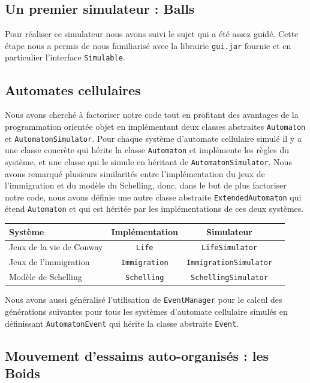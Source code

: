 \documentclass [a4paper,11pt,titlepage] {article}
\begin{document}
\subsection{Un premier simulateur : Balls}
Pour réaliser ce simulateur nous avons suivi le sujet qui a été assez guidé. Cette étape nous a permis de nous familiarisé avec la librairie \texttt{gui.jar} fournie et en particulier l'interface \texttt{Simulable}.
\subsection{Automates cellulaires}
Nous avons cherché à factoriser notre code tout en profitant des avantages de la programmation orientée objet en implémentant deux classes abstraites \texttt{Automaton} et \texttt{AutomatonSimulator}. Pour chaque système d'automate cellulaire simulé il y a une classe concrète qui hérite la classe \texttt{Automaton} et implémente les règles du système, et une classe qui le simule en héritant de \texttt{AutomatonSimulator}. Nous avons remarqué plusieurs similarités entre l'implémentation du jeux de l'immigration et du modèle du Schelling, donc, dans le but de plus factoriser notre code, nous avons définie une autre classe abstraite \texttt{ExtendedAutomaton} qui étend \texttt{Automaton} et qui est héritée par les implémentations de ces deux systèmes.

\begin{center}
\begin{tabular}{|l|c|c|c|}
  \hline
    Système & Implémentation & Simulateur \\
  \hline
   Jeux de la vie de Conway & \texttt{Life} & \texttt{LifeSimulator}\\
  \hline
  Jeux de l'immigration & \texttt{Immigration} & \texttt{ImmigrationSimulator}\\
  \hline
  Modèle de Schelling & \texttt{Schelling} & \texttt{SchellingSimulator}\\
  \hline
 
\end{tabular}
\end{center}

Nous avons aussi généralisé l'utilisation de \texttt{EventManager} pour le calcul des générations suivantes pour tous les systèmes d'automate cellulaire simulés en définissant \texttt{AutomatonEvent} qui hérite la classe abstraite \texttt{Event}.


\subsection{Mouvement d’essaims auto-organisés : les Boids}
\end{document}
